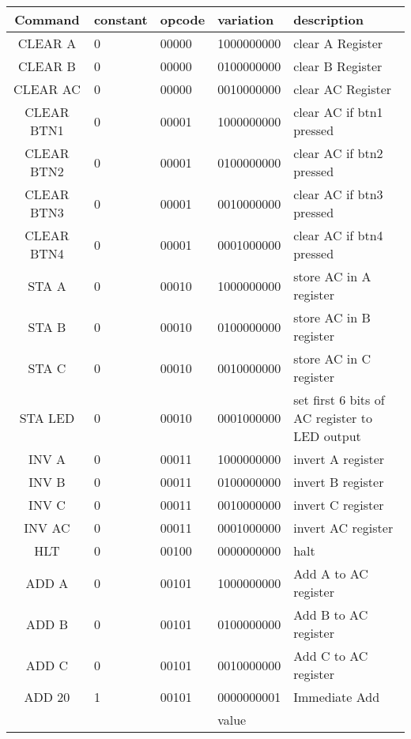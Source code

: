 \documentclass[a4paper,12pt]{article}
\begin{document}
    \begin{table}[H]
    \footnotesize
    \centering
    \setlength{\tabcolsep}{0.5em} %
    {\renewcommand{\arraystretch}{1}%
    \begin{tabular}{|c|l|l|l|p{6cm}|}
    \hline
    \textbf{Command} & constant & opcode & variation & description \\ \hline
    CLEAR A & 0 & 00000 & 1000000000 & clear A Register \\ \hline
    CLEAR B & 0 & 00000 & 0100000000 & clear B Register\\ \hline
    CLEAR AC & 0 & 00000 & 0010000000 & clear AC Register\\ \hline
    CLEAR BTN1 & 0 & 00001 & 1000000000 & clear AC if btn1 pressed\\ \hline
    CLEAR BTN2 & 0 & 00001 & 0100000000 & clear AC if btn2 pressed\\ \hline
    CLEAR BTN3 & 0 & 00001 & 0010000000 & clear AC if btn3 pressed\\ \hline
    CLEAR BTN4 & 0 & 00001 & 0001000000 & clear AC if btn4 pressed\\ \hline
    STA A & 0 & 00010 & 1000000000 & store AC in A register\\ \hline
    STA B & 0 & 00010 & 0100000000 & store AC in B register\\ \hline
    STA C & 0 & 00010 & 0010000000 & store AC in C register\\ \hline
    STA LED & 0 & 00010 & 0001000000 & set first 6 bits of AC register to LED output\\ \hline
    INV A & 0 & 00011 & 1000000000 & invert A register\\ \hline
    INV B & 0 & 00011 & 0100000000 & invert B register\\ \hline
    INV C & 0 & 00011 & 0010000000 & invert C register\\ \hline
    INV AC & 0 & 00011 & 0001000000 & invert AC register\\ \hline
    HLT & 0 & 00100 & 0000000000 & halt\\ \hline
    ADD A & 0 & 00101 & 1000000000 & Add A to AC register\\ \hline
    ADD B & 0 & 00101 & 0100000000 & Add B to AC register\\ \hline
    ADD C & 0 & 00101 & 0010000000 & Add C to AC register\\ \hline
    ADD 20 & 1 & 00101 & 0000000001 & Immediate Add \\ 
    &  &  & value  & \\ \hline

\end{tabular}}
\end{table}
\end{document}
